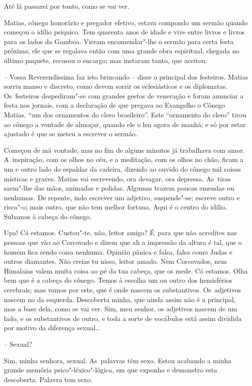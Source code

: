 Até lá passarei por tonto, como se vai ver.

Matias, cônego honorário e pregador efetivo, estava compondo um sermão
quando começou o idílio psíquico. Tem quarenta anos de idade e vive
entre livros e livros para os lados da Gamboa. Vieram encomendar"-lhe o
sermão para certa festa próxima; ele que se regalava então com uma
grande obra espiritual, chegada no último paquete, recusou o encargo;
mas instaram tanto, que aceitou.

-- Vossa Reverendíssima faz isto brincando -- disse o principal dos
festeiros. Matias sorriu manso e discreto, como devem sorrir os
eclesiásticos e os diplomatas. Os~festeiros despediram"-se com grandes
gestos de veneração e foram anunciar a festa nos jornais, com a
declaração de que pregava ao Evangelho o Cônego Matias, ``um dos
ornamentos do clero brasileiro''. Este ``ornamento do clero'' tirou ao
cônego a vontade de almoçar, quando ele o leu agora de manhã; e só por
estar ajustado é que se meteu a escrever o sermão.

Começou de má vontade, mas no fim de alguns minutos já trabalhava com
amor. A~inspiração, com os olhos no céu, e a meditação, com os olhos no
chão, ficam a um e outro lado do espaldar da cadeira, dizendo ao ouvido
do cônego mil coisas místicas e graves. Matias vai escrevendo, ora
devagar, ora depressa. As~tiras saem"-lhe das mãos, animadas e polidas.
Algumas trazem poucas emendas ou nenhumas. De repente, indo escrever um
adjetivo, suspende"-se; escreve outro e risca"-o; mais outro, que não tem
melhor fortuna. Aqui é o centro do idílio. Subamos à cabeça do cônego.

Upa! Cá estamos. Custou"-te, não, leitor amigo? É~para que não acredites
nas pessoas que vão ao Corcovado e dizem que ali a impressão da altura é
tal, que o homem fica sendo coisa nenhuma. Opinião pânica e falsa, falsa
como Judas e outros diamantes. Não creias tu nisso, leitor amado. Nem
Corcovados, nem Himalaias valem muita coisa ao pé da tua cabeça, que os
mede. Cá estamos. Olha bem que é a cabeça do cônego. Temos à escolha um
ou outro dos hemisférios cerebrais; mas vamos por este, que é onde
nascem os substantivos. Os~adjetivos nascem no da esquerda. Descoberta
minha, que ainda assim não é a principal, mas a base dela, como se vai
ver. Sim, meu senhor, os adjetivos nascem de um lado, e os substantivos
de outro, e toda a sorte de vocábulos está assim dividida por motivo da
diferença sexual\ldots{}

-- Sexual?

Sim, minha senhora, sexual. As~palavras têm sexo. Estou acabando a minha
grande memória psico"-léxico"-lógica, em que exponho e demonstro esta
descoberta. Palavra tem sexo.

